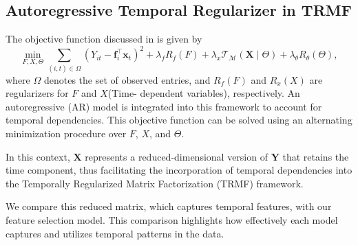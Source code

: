 \documentclass[twoside,11pt]{article}
\begin{document}
\subsection{Autoregressive Temporal Regularizer in TRMF}

The objective function discussed in \cite{author2024} is given by \begin{equation}
	\min_{F, X, \Theta} \sum_{(i,t) \in \Omega} \left(Y_{it} - \mathbf{f}_i^{\top} \mathbf{x}_t\right)^2 + \lambda_f R_f(F) + \lambda_x \mathcal{T}_{\mathcal{M}}(\mathbf{X} \mid \Theta) + \lambda_{\theta} R_{\theta}(\Theta),
\end{equation} where $\Omega$ denotes the set of observed entries, and $R_f(F)$ and $R_x(X)$ are regularizers for $F$ and $X$(Time- dependent variables), respectively. An autoregressive (AR) model is integrated into this framework to account for temporal dependencies. This objective function can be solved using an alternating minimization procedure over $F$, $X$, and $\Theta$.

In this context, $\mathbf{X}$ represents a reduced-dimensional version of $\mathbf{Y}$ that retains the time component, thus facilitating the incorporation of temporal dependencies into the Temporally Regularized Matrix Factorization (TRMF) framework.

We compare this reduced matrix, which captures temporal features, with our feature selection model. This comparison highlights how effectively each model captures and utilizes temporal patterns in the data.
\end{document}
